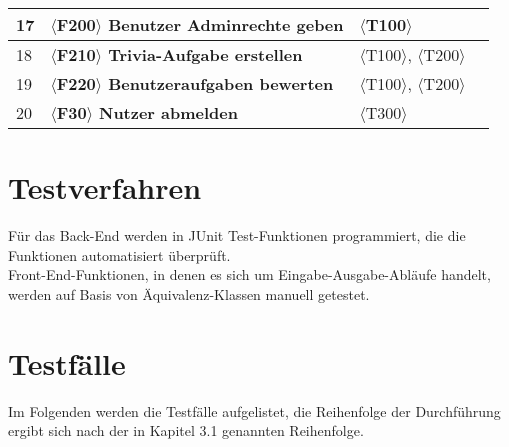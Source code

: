 \begin{center}
\begin{longtable}{|m{}|m{}|m{}|m{}|}
		\hline
		17  & \textbf{$\langle$F200$\rangle$ Benutzer Adminrechte geben } &  $\langle$T100$\rangle$   &    \\ 
		\hline
		18  & \textbf{$\langle$F210$\rangle$ Trivia-Aufgabe erstellen } &  $\langle$T100$\rangle$, $\langle$T200$\rangle$   &     \\ 
		\hline
		19  & \textbf{$\langle$F220$\rangle$ Benutzeraufgaben bewerten } &  $\langle$T100$\rangle$, $\langle$T200$\rangle$   &    \\ 
		\hline
		20  & \textbf{$\langle$F30$\rangle$ Nutzer abmelden } &  $\langle$T300$\rangle$   &     \\ 
		\hline
	\end{longtable}
\end{center}

\section{Testverfahren}

Für das Back-End werden in JUnit Test-Funktionen programmiert, die die Funktionen automatisiert überprüft.\\
Front-End-Funktionen, in denen es sich um Eingabe-Ausgabe-Abläufe handelt, werden auf Basis von Äquivalenz-Klassen manuell getestet.  


\section{Testfälle}

Im Folgenden werden die Testfälle aufgelistet, die Reihenfolge der Durchführung ergibt sich nach der in Kapitel 3.1 genannten Reihenfolge.

